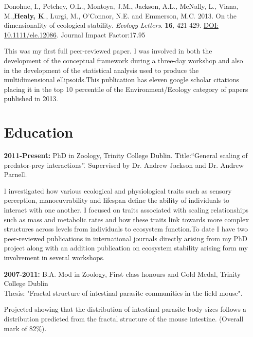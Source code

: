 \documentclass[10pt,a4paper]{article}
\begin{document}
\begin{flushleft}
\setlength{\parindent}{0mm}Donohue, I., Petchey, O.L., Montoya, J.M., Jackson, A.L., McNally, L., Viana, M.,\textbf{Healy, K}., Lurgi, M., O’Connor, N.E. and Emmerson, M.C. 2013. On the dimensionality of ecological stability. \textit{Ecology Letters}. \textbf{16}, 421-429. \href{http://onlinelibrary.wiley.com/doi/10.1111/ele.12086/abstract}{DOI: 10.1111/ele.12086}.  Journal Impact Factor:17.95\\
\smallskip
\par{\fontsize{10.5}{10}\selectfont This was my first full peer-reviewed paper. I was involved in both the development of the conceptual framework during a three-day workshop and also in the development of the statistical analysis used to produce the multidimensional ellipsoids.This publication has eleven google scholar citations placing it in the top 10 percentile of the Environment/Ecology category of papers published in 2013.}
\end{flushleft}


\section{Education}

\raggedright	
\textbf{2011-Present:} PhD in Zoology, Trinity College Dublin. Title:“General scaling of predator-prey interactions”. Supervised by Dr. Andrew Jackson and Dr. Andrew Parnell. \smallskip
\par{\fontsize{10.5}{10}\selectfont I investigated how various ecological and physiological traits such as sensory perception, manoeuvrability and lifespan define the ability of individuals to interact with one another. I focused on traits associated with scaling relationships such as mass and metabolic rates and how these traits link towards more complex structures across levels from individuals to ecosystem function.To date I have two peer-reviewed publications in international journals directly arising from my PhD project along with an addition publication on ecosystem stability arising form my involvement in several workshops.\bigskip}


\textbf{2007-2011:} B.A. Mod in Zoology, First class honours and Gold Medal, Trinity College Dublin\\
Thesis: "Fractal structure of intestinal parasite communities in the field mouse".\\
\par{\fontsize{10.5}{10}\selectfont Projected showing that the distribution of intestinal parasite body sizes follows a distribution predicted from the fractal structure of the mouse intestine. (Overall mark of 82\%).\bigskip}
\end{document}
